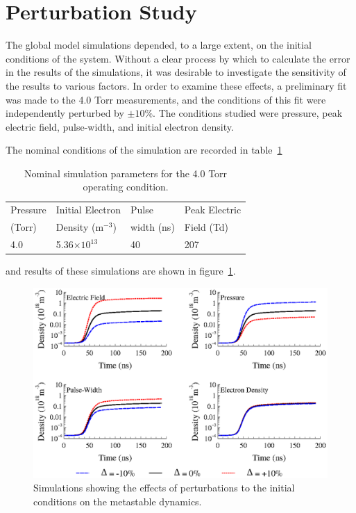 \section{Perturbation Study}

The global model simulations depended, to a large extent, on the initial
conditions of the system. Without a clear process by which to calculate the
error in the results of the simulations, it was desirable to investigate the
sensitivity of the results to various factors. In order to examine these
effects, a preliminary fit was made to the 4.0 Torr measurements, and the
conditions of this fit were independently perturbed by $\pm10\%$. The conditions
studied were pressure, peak electric field, pulse-width, and initial electron
density.

The nominal conditions of the simulation are recorded in table~\ref{tbl:nominal}
\begin{table}
  \centering
  \caption{Nominal simulation parameters for the 4.0 Torr operating condition.}
  \begin{tabular}{llll}
    \toprule
    Pressure & Initial Electron    & Pulse      & Peak Electric \\
    (Torr)   & Density (m$^{-3}$)  & width (ns) & Field (Td)\\ 
    \midrule
    4.0      & 5.36$\times10^{13}$ & 40         & 207 \\
    \bottomrule
  \end{tabular}
  \label{tbl:nominal}
\end{table}
and results of these simulations are shown in figure~\ref{fig:perturbed}.
\begin{figure}
  \centering
  \includegraphics{./chapters/modeling/figures/perturbed.eps}
  \caption{Simulations showing the effects of perturbations to the initial
  conditions on the metastable dynamics.}
  \label{fig:perturbed}
\end{figure}
